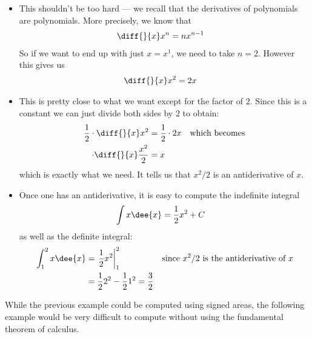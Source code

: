 \begin{eg}
\begin{itemize}
\item This shouldn't be too hard --- we recall that the derivatives of polynomials are
polynomials. More precisely, we know that
\begin{align*}
  \diff{}{x}x^n &= n x^{n-1}
\end{align*}
So if we want to end up with just $x = x^1$, we need to take $n=2$. However this gives us
\begin{align*}
  \diff{}{x}x^2 &= 2x
\end{align*}
\item This is pretty close to what we want except for the factor of $2$. Since this is a
constant we can just divide both sides by $2$ to obtain:
\begin{align*}
  \frac{1}{2}\cdot \diff{}{x}x^2 &= \frac{1}{2}\cdot 2x &\text{which becomes}\\
  \cdot \diff{}{x}\frac{x^2}{2}&= x
\end{align*}
which is exactly what we need. It tells us that $x^2/2$ is an antiderivative of $x$.
\item  Once one has an antiderivative, it is easy to compute the indefinite integral
\begin{align*}
\int x\dee{x} &= \frac{1}{2}x^2+C
\end{align*}
as well as the definite integral:
\begin{align*}
\int_1^2 x\dee{x}
&= \left.\frac{1}{2}x^2 \right|_1^2 &\text{since $x^2/2$ is the antiderivative of $x$}\\
 &=\frac{1}{2} 2^2- \frac {1}{2}1^2
 =\frac{3}{2}
\end{align*}
\end{itemize}


\end{eg}
While the previous example could be computed using signed areas, the following example
would be very difficult to compute without using the fundamental theorem of calculus.
